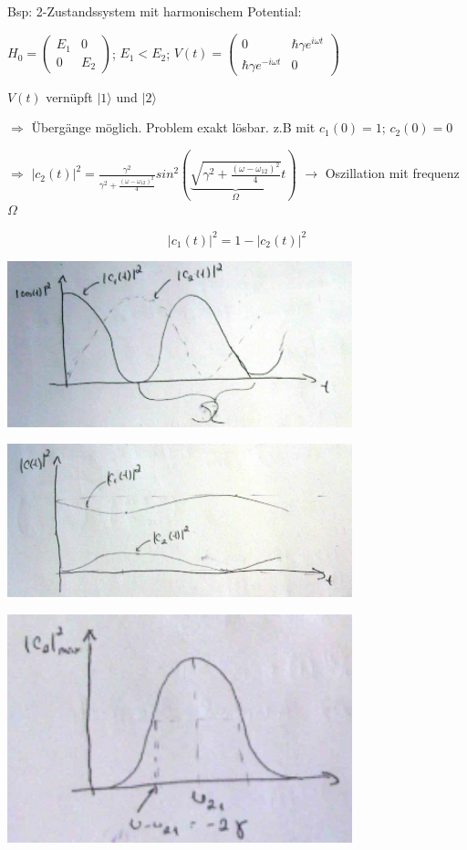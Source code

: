 Bsp: 2-Zustandssystem mit harmonischem Potential:


\(H_0 =\begin{pmatrix} E_1& 0\\0&E_2\end{pmatrix}\); \(E_1<E_2\); \(V(t) =\begin{pmatrix}0&\hbar \gamma e^{i\omega t}\\\hbar \gamma e^{-i\omega t}&0 \end{pmatrix}\)


\(V(t)\) vernüpft \(|1\rangle\) und \(|2\rangle\)


\(\Rightarrow\) Übergänge möglich. Problem exakt lösbar. z.B mit \(c_1(0)=1\); \(c_2(0)=0\)


\(\Rightarrow\) \(|c_2(t)|^2=\frac{\gamma^2}{\gamma^2+\frac{(\omega-\omega_{12})^2}{4}}sin^2\left( \underbrace{\sqrt{\gamma^2+\frac{(\omega-\omega_{12})^2}{4}}}_{\Omega}t\right)\) \(\rightarrow\) Oszillation mit frequenz \(\Omega\)

 \[|c_1(t)|^2 = 1-|c_2(t)|^2\]



\includegraphics[width=0.75\textwidth]{kap03_04.png}


\includegraphics[width=0.75\textwidth]{kap03_05.png}


\includegraphics[width=0.75\textwidth]{kap03_06.png}


